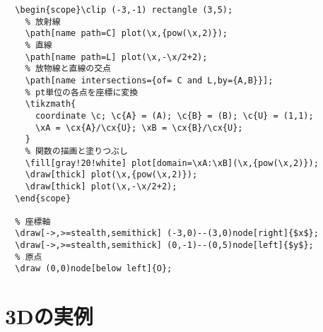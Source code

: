 \documentclass[16pt,b5paper]{article}
\begin{document}
\begin{lstlisting}
  \begin{scope}\clip (-3,-1) rectangle (3,5);
    % 放射線
    \path[name path=C] plot(\x,{pow(\x,2)});
    % 直線
    \path[name path=L] plot(\x,-\x/2+2);
    % 放物線と直線の交点
    \path[name intersections={of= C and L,by={A,B}}];
    % pt単位の各点を座標に変換
    \tikzmath{
      coordinate \c; \c{A} = (A); \c{B} = (B); \c{U} = (1,1);
      \xA = \cx{A}/\cx{U}; \xB = \cx{B}/\cx{U};
    }
    % 関数の描画と塗りつぶし
    \fill[gray!20!white] plot[domain=\xA:\xB](\x,{pow(\x,2)});
    \draw[thick] plot(\x,{pow(\x,2)});
    \draw[thick] plot(\x,-\x/2+2);
  \end{scope}

  % 座標軸
  \draw[->,>=stealth,semithick] (-3,0)--(3,0)node[right]{$x$};
  \draw[->,>=stealth,semithick] (0,-1)--(0,5)node[left]{$y$};
  % 原点
  \draw (0,0)node[below left]{O};
\end{lstlisting}

\section{3Dの実例}
\end{document}
